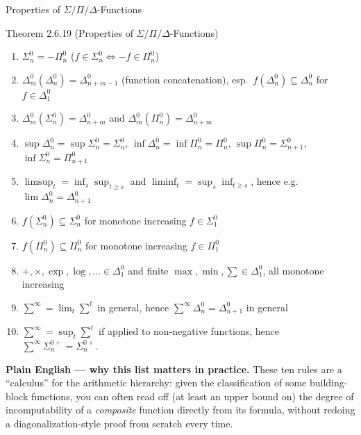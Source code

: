 \documentclass[aspectratio=169,10pt]{beamer}
\begin{document}
\begin{frame}[allowframebreaks]{Properties of $\Sigma/\Pi/\Delta$-Functions}
  \begin{block}{Theorem 2.6.19 (Properties of $\Sigma/\Pi/\Delta$-Functions)}
    \begin{enumerate}
      \item[(i)] $\Sigma_n^0 = -\Pi_n^0$ \quad ($f \in \Sigma_n^0 \iff -f \in \Pi_n^0$)
      \item[(ii)] $\Delta_m^0(\Delta_n^0) = \Delta_{n+m-1}^0$ (function
        concatenation), esp.\ $f(\Delta_n^0) \subseteq \Delta_n^0$ for
        $f \in \Delta_1^0$
      \item[(iii)] $\Delta_m^0(\Sigma_n^0) = \Delta_{n+m}^0$ and
        $\Delta_m^0(\Pi_n^0) = \Delta_{n+m}^0$
      \item[(iv)] $\sup \Delta_n^0 = \sup \Sigma_n^0 = \Sigma_n^0$, \quad
        $\inf \Delta_n^0 = \inf \Pi_n^0 = \Pi_n^0$, \quad
        $\sup \Pi_n^0 = \Sigma_{n+1}^0$, \quad $\inf \Sigma_n^0 = \Pi_{n+1}^0$
      \item[(v)] $\limsup_t = \inf_s \sup_{t \geq s}$ and
        $\liminf_t = \sup_s \inf_{t \geq s}$, hence e.g.
        $\lim \Delta_n^0 = \Delta_{n+1}^0$
      \item[(vi)] $f(\Sigma_n^0) \subseteq \Sigma_n^0$ for monotone increasing
        $f \in \Sigma_1^0$
      \item[(vii)] $f(\Pi_n^0) \subseteq \Pi_n^0$ for monotone increasing
        $f \in \Pi_1^0$
      \item[(viii)] $+, \times, \exp, \log, \dots \in \Delta_1^0$ and finite
        $\max, \min, \sum \in \Delta_1^0$, all monotone increasing
      \item[(ix)] $\sum^{\infty} = \lim_t \sum^t$ in general, hence
        $\sum^{\infty} \Delta_n^0 = \Delta_{n+1}^0$ in general
      \item[(x)] $\sum^{\infty} = \sup_t \sum^t$ if applied to non-negative
        functions, hence $\sum^{\infty} \Sigma_n^{0+} = \Sigma_n^{0+}$.
    \end{enumerate}
  \end{block}

  \framebreak
  \textbf{Plain English --- why this list matters in practice.} These ten
  rules are a ``calculus'' for the arithmetic hierarchy: given the
  classification of some building-block functions, you can often read off
  (at least an upper bound on) the degree of incomputability of a
  \emph{composite} function directly from its formula, without redoing a
  diagonalization-style proof from scratch every time.


\end{frame}
\end{document}
